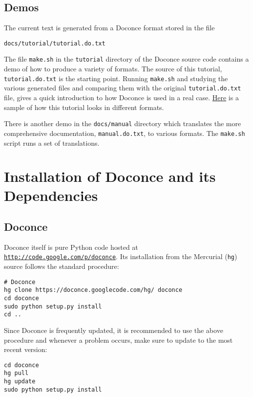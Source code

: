 \documentclass[%
oneside,                 %
final,                   %
10pt]{article}
\begin{document}
\subsection{Demos}

The current text is generated from a Doconce format stored in the file
\begin{Verbatim}[fontsize=\fontsize{9pt}{9pt},tabsize=8,baselinestretch=0.85,
fontfamily=tt,xleftmargin=7mm]
docs/tutorial/tutorial.do.txt
\end{Verbatim}
\noindent
The file {\fontsize{10pt}{10pt}\Verb!make.sh!} in the {\fontsize{10pt}{10pt}\Verb!tutorial!} directory of the
Doconce source code contains a demo of how to produce a variety of
formats.  The source of this tutorial, {\fontsize{10pt}{10pt}\Verb!tutorial.do.txt!} is the
starting point.  Running {\fontsize{10pt}{10pt}\Verb!make.sh!} and studying the various generated
files and comparing them with the original {\fontsize{10pt}{10pt}\Verb!tutorial.do.txt!} file,
gives a quick introduction to how Doconce is used in a real case.
\href{{https://doconce.googlecode.com/hg/doc/demos/tutorial/index.html}}{Here}
is a sample of how this tutorial looks in different formats.

There is another demo in the {\fontsize{10pt}{10pt}\Verb!docs/manual!} directory which
translates the more comprehensive documentation, {\fontsize{10pt}{10pt}\Verb!manual.do.txt!}, to
various formats. The {\fontsize{10pt}{10pt}\Verb!make.sh!} script runs a set of translations.


\section{Installation of Doconce and its Dependencies}

\subsection{Doconce}

Doconce itself is pure Python code hosted at \href{{http://code.google.com/p/doconce}}{\nolinkurl{http://code.google.com/p/doconce}}.  Its installation from the
Mercurial ({\fontsize{10pt}{10pt}\Verb!hg!}) source follows the standard procedure:
\vspace{4pt}
\begin{Verbatim}[numbers=none,frame=lines,label=\fbox{{\tiny Terminal}},fontsize=\fontsize{9pt}{9pt},
labelposition=topline,framesep=2.5mm,framerule=0.7pt]
# Doconce
hg clone https://doconce.googlecode.com/hg/ doconce
cd doconce
sudo python setup.py install
cd ..
\end{Verbatim}
Since Doconce is frequently updated, it is recommended to use the
above procedure and whenever a problem occurs, make sure to
update to the most recent version:
\vspace{4pt}
\begin{Verbatim}[numbers=none,frame=lines,label=\fbox{{\tiny Terminal}},fontsize=\fontsize{9pt}{9pt},
labelposition=topline,framesep=2.5mm,framerule=0.7pt]
cd doconce
hg pull
hg update
sudo python setup.py install
\end{Verbatim}
\end{document}
